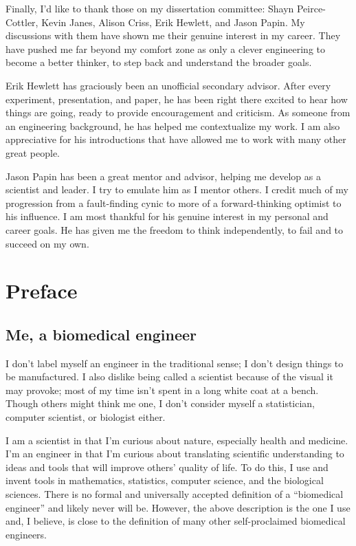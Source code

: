 Finally, I'd like to thank those on my dissertation committee:
Shayn Peirce-Cottler, Kevin Janes, Alison Criss, Erik Hewlett, and Jason Papin.
My discussions with them have shown me their genuine interest in my career.
They have pushed me far beyond my comfort zone as only
a clever engineering to become a better thinker, to step
back and understand the broader goals.

Erik Hewlett has graciously been an unofficial secondary advisor.
After every experiment, presentation, and paper, he has been right there
excited to hear how things are going, ready to provide encouragement and criticism.
As someone from an engineering background,
he has helped me contextualize my work.
I am also appreciative for 
his introductions that have allowed me to work with many other great people.

Jason Papin has been a great mentor and advisor, helping
me develop as a scientist and leader.
I try to emulate him as I mentor others.
I credit much of my progression from a fault-finding cynic to more of a  
forward-thinking optimist to his influence.
I am most thankful for his genuine interest in 
my personal and career goals. 
He has given me the freedom to think 
independently, to fail and to succeed on my own.


\chapter{Preface}

\section{Me, a biomedical engineer}

I don't label myself an engineer in the traditional sense; 
I don't design things to be manufactured. I also dislike 
being called a scientist because of the visual it may provoke; 
most of my time isn't spent in a long white coat at a 
bench. Though others might think me one, I don't consider 
myself a statistician, computer scientist, or biologist either.

I am a scientist in that I’m curious about nature, especially 
health and medicine. I’m an engineer in that I’m curious 
about translating scientific understanding to ideas and 
tools that will improve others' quality of life. To do 
this, I use and invent tools in mathematics, statistics, 
computer science, and the biological sciences. There is 
no formal and universally accepted definition of a 
``biomedical engineer'' and likely never will be. However, 
the above description is the one I use and, I believe, is
close to the definition of many other self-proclaimed 
biomedical engineers.

